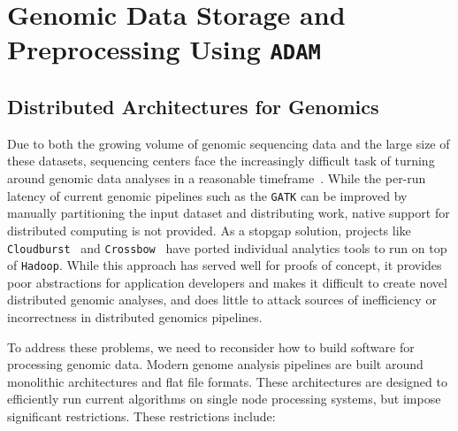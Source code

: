 \documentclass[masters]{ucbthesis}
\begin{document}
\chapter{Genomic Data Storage and Preprocessing Using \texttt{ADAM}}

\section{Distributed Architectures for Genomics}
\label{sec:distributed-architectures}

Due to both the growing volume of genomic sequencing data and the large size of these datasets,
sequencing centers face the increasingly difficult task of turning around genomic data analyses in a
reasonable timeframe~\cite{schadt10, stein10}. While the per-run latency of current genomic pipelines
such as the \texttt{GATK} can be improved by manually partitioning the input dataset and distributing
work, native support for distributed computing is not provided. As a stopgap solution, projects like
\texttt{Cloudburst}~\cite{schatz09} and \texttt{Crossbow}~\cite{langmead09} have ported individual
analytics tools to run on top of \texttt{Hadoop}. While this approach has served well for proofs of concept,
it provides poor abstractions for application developers and makes it difficult to create novel distributed
genomic analyses, and does little to attack sources of inefficiency or incorrectness in distributed
genomics pipelines.

To address these problems, we need to reconsider how to build software for processing genomic data.
Modern genome analysis pipelines are built around monolithic architectures and flat file formats.
These architectures are designed to efficiently run current algorithms on single node processing
systems, but impose significant restrictions. These restrictions include:
\end{document}
